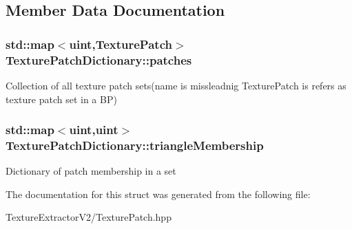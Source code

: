 \subsection{Member Data Documentation}
\hypertarget{struct_texture_patch_dictionary_a21c6633d4831bd84be792b45020f3805}{}
\subsubsection[{patches}]{\setlength{\rightskip}{0pt plus 5cm}std\+::map$<$uint,{\bf Texture\+Patch}$>$ Texture\+Patch\+Dictionary\+::patches}\label{struct_texture_patch_dictionary_a21c6633d4831bd84be792b45020f3805}
Collection of all texture patch sets(name is missleadnig Texture\+Patch is refers as texture patch set in a B\+P) \hypertarget{struct_texture_patch_dictionary_a188d2b68586a902ef8c969458e9001c6}{}
\subsubsection[{triangle\+Membership}]{\setlength{\rightskip}{0pt plus 5cm}std\+::map$<$uint,uint$>$ Texture\+Patch\+Dictionary\+::triangle\+Membership}\label{struct_texture_patch_dictionary_a188d2b68586a902ef8c969458e9001c6}
Dictionary of patch membership in a set 

The documentation for this struct was generated from the following file\+:\begin{DoxyCompactItemize}
\item 
Texture\+Extractor\+V2/Texture\+Patch.\+hpp\end{DoxyCompactItemize}
